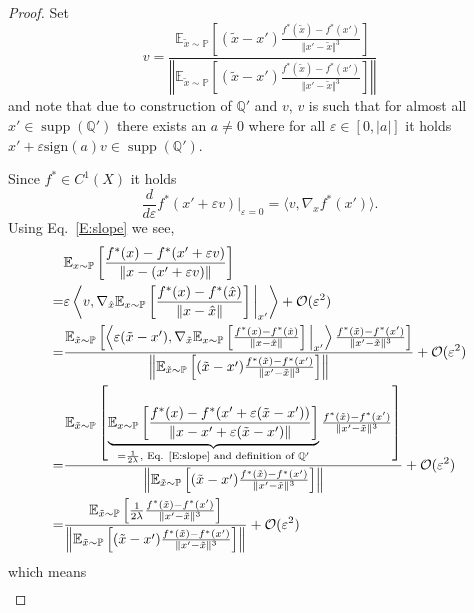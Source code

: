\documentclass{article}
\DeclareMathOperator{\supp}{supp}
\begin{document}
\begin{proof}
 Set
\[v=\frac{\mathbb E_{\tilde x\sim\mathbb P}[(\tilde x- x')\frac{f^*(\tilde x)-f^*(x')}{\Vert x'-\tilde x\Vert^3}]}{\left\Vert\mathbb E_{\tilde x\sim\mathbb P}[(\tilde x- x')\frac{f^*(\tilde x)-f^*(x')}{\Vert x'-\tilde x\Vert^3}]\right\Vert}\]
and note that due to construction of $\mathbb Q'$ and $v$, $v$ is such that for almost all $x'\in\supp(\mathbb Q')$ there exists an
$a\neq 0$ where for all $\varepsilon\in[0,|a|]$ it holds $x'+\varepsilon\text{sign}(a) v\in\supp(\mathbb Q')$.

Since $f^*\in C^1(X)$ it holds
\[\frac{d}{d\varepsilon}f^*(x'+\varepsilon v)|_{\varepsilon=0}=\langle v,\nabla_x f^*(x')\rangle.\]
Using Eq.\ \ref{E:slope} we see,
\begin{align*}
&\mathbb E_{x\sim\mathbb P}\left[\frac{f^*(x)-f^*(x'+\varepsilon v)}{\Vert x-(x'+\varepsilon v)\Vert}\right]\\
=&\varepsilon \left\langle v,\nabla_{\hat x}\mathbb E_{x\sim\mathbb P}\left[\frac{f^*(x)-f^*(\hat x)}{\Vert x-\hat x\Vert}\right]\bigg|_{x'}\right\rangle +\mathcal O(\varepsilon^2)\\
=&\frac{\mathbb E_{\tilde x\sim\mathbb P}\left[\left\langle \varepsilon(\tilde x- x'),
\nabla_{\tilde x}\mathbb E_{x\sim\mathbb P}\left[\frac{f^*(x)-f^*(\hat x)}{\Vert x-\hat x\Vert}\right]\Big|_{x'}
\right\rangle\frac{f^*(\tilde x)-f^*(x')}{\Vert x'-\tilde x\Vert^3}\right]}
{\left\Vert\mathbb E_{\tilde x\sim\mathbb P}\left[(\tilde x- x')\frac{f^*(\tilde x)-f^*(x')}{\Vert x'-\tilde x\Vert^3}\right]\right\Vert}
+\mathcal O(\varepsilon^2)\\
=&\frac{\mathbb E_{\tilde x\sim\mathbb P}\left[
\underbrace{\mathbb E_{x\sim\mathbb P}\left[\frac{f^*(x)-f^*(x' + \varepsilon(\tilde x - x'))}{\Vert x-x'+\varepsilon(\tilde x - x')\Vert}\right]}_{=\frac{1}{2\lambda},\text{ Eq. \ref{E:slope} and definition of }\mathbb Q'}
\frac{f^*(\tilde x)-f^*(x')}{\Vert x'-\tilde x\Vert^3}\right]}
{\left\Vert\mathbb E_{\tilde x\sim\mathbb P}\left[(\tilde x- x')\frac{f^*(\tilde x)-f^*(x')}{\Vert x'-\tilde x\Vert^3}\right]\right\Vert}
+\mathcal O(\varepsilon^2)\\
=&\frac{\mathbb E_{\tilde x\sim\mathbb P}\left[
\frac{1}{2\lambda}
\frac{f^*(\tilde x)-f^*(x')}{\Vert x'-\tilde x\Vert^3}\right]}
{\left\Vert\mathbb E_{\tilde x\sim\mathbb P}\left[(\tilde x- x')\frac{f^*(\tilde x)-f^*(x')}{\Vert x'-\tilde x\Vert^3}\right]\right\Vert}
+\mathcal O(\varepsilon^2)
\end{align*}
which means
\begin{align*}

\end{align*}
\end{proof}
\end{document}

